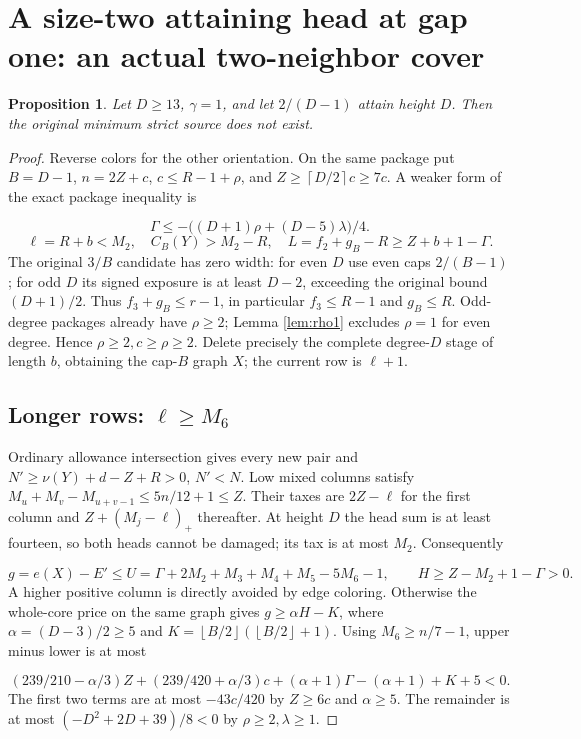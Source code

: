 \documentclass[11pt,a4paper]{article}
\newcommand{\floor}[1]{\left\lfloor#1\right\rfloor}
\newcommand{\ceil}[1]{\left\lceil#1\right\rceil}
\newtheorem{proposition}[theorem]{Proposition}
\theoremstyle{definition}
\begin{document}
\section{A size-two attaining head at gap one: an actual two-neighbor cover}\label{app:gap1-two}
\begin{proposition}\label{prop:gap1-two}
Let $D\ge13$, $\gamma=1$, and let $2/(D-1)$ attain height $D$.
Then the original minimum strict source does not exist.
\end{proposition}
\begin{proof}
Reverse colors for the other orientation.
On the same package put $B=D-1$,
$n=2Z+c$, $c\le R-1+\rho$, and $Z\ge\ceil{D/2}c\ge7c$.
A weaker form of the exact package inequality is

\[
\Gamma\le-\bigl((D+1)\rho+(D-5)\lambda\bigr)/4.
\]
\[
\ell=R+b<M_2,\quad C_B(Y)>M_2-R,\quad
L=f_2+g_B-R\ge Z+b+1-\Gamma.
\]
The original $3/B$ candidate has zero width:
for even $D$ use even caps $2/(B-1)$;
for odd $D$ its signed exposure is at least $D-2$, exceeding the
original bound $(D+1)/2$.
Thus $f_3+g_B\le r-1$, in particular $f_3\le R-1$ and $g_B\le R$.
Odd-degree packages already have $\rho\ge2$;
Lemma \ref{lem:rho1} excludes $\rho=1$ for even degree.
Hence $\rho\ge2,c\ge\rho\ge2$.
Delete precisely the complete degree-$D$ stage of length $b$,
obtaining the cap-$B$ graph $X$; the current row is $\ell+1$.

\subsection*{Longer rows: $\ell\ge M_6$}
Ordinary allowance intersection gives every new pair and
$N'\ge\nu(Y)+d-Z+R>0$, $N'<N$.
Low mixed columns satisfy
$M_u+M_v-M_{u+v-1}\le5n/12+1\le Z$.
Their taxes are $2Z-\ell$ for the first column and
$Z+(M_j-\ell)_+$ thereafter.
At height $D$ the head sum is at least fourteen, so both heads cannot be damaged;
its tax is at most $M_2$. Consequently

\[
g=e(X)-E'\le U=\Gamma+2M_2+M_3+M_4+M_5-5M_6-1,
\qquad H\ge Z-M_2+1-\Gamma>0.
\]
A higher positive column is directly avoided by edge coloring.
Otherwise the whole-core price on the same graph gives $g\ge\alpha H-K$,
where $\alpha=(D-3)/2\ge5$ and
$K=\floor{B/2}(\floor{B/2}+1)$.
Using $M_6\ge n/7-1$, upper minus lower is at most

\[
(239/210-\alpha/3)Z+(239/420+\alpha/3)c
+(\alpha+1)\Gamma-(\alpha+1)+K+5<0.
\]
The first two terms are at most $-43c/420$ by $Z\ge6c$ and $\alpha\ge5$.
The remainder is at most $(-D^2+2D+39)/8<0$ by $\rho\ge2,\lambda\ge1$.


\end{proof}
\end{document}
